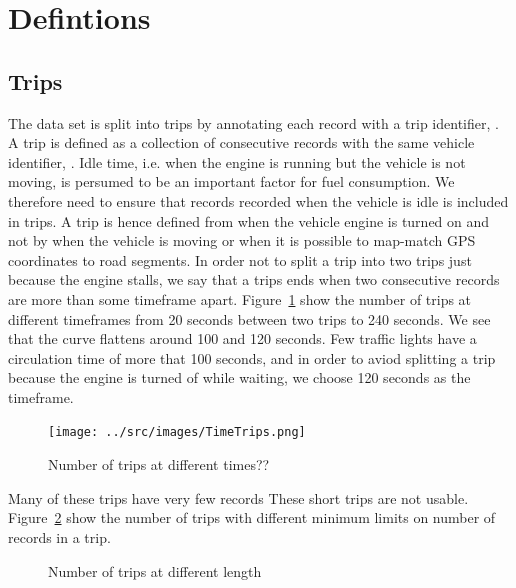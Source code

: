 \section{Defintions}
\subsection{Trips}
The data set is split into trips by annotating each record with a trip identifier, \tid.
A trip is defined as a collection of consecutive records with the same vehicle identifier, \vid.
Idle time, i.e. when the engine is running but the vehicle is not moving, is persumed to be an important factor for fuel consumption. 
We therefore need to ensure that records recorded when the vehicle is idle is included in trips. 
A trip is hence defined from when the vehicle engine is turned on and not by when the vehicle is moving or when it is possible to map-match GPS coordinates to road segments.
In order not to split a trip into two trips just because the engine stalls, we say that a trips ends when two consecutive records are more than some timeframe apart.
Figure~\ref{fig:TimeTrips} show the number of trips at different timeframes from 20 seconds between two trips to 240 seconds.
We see that the curve flattens around 100 and 120 seconds. 
Few traffic lights have a circulation time of more that 100 seconds, and in order to aviod splitting a trip because the engine is turned of while waiting, we choose 120 seconds as the timeframe. 
\begin{figure}[htb]
\centering
\texttt{[image: ../src/images/TimeTrips.png]}
\caption{Number of trips at different times??}
\label{fig:TimeTrips}
\end{figure}

Many of these trips have very few records %
These short trips are not usable.
Figure~\ref{fig:LengthTrips} show the number of trips with different minimum limits on number of records in a trip.
\begin{figure}[htb]
\centering
\caption{Number of trips at different length}
\label{fig:LengthTrips}
\end{figure}


